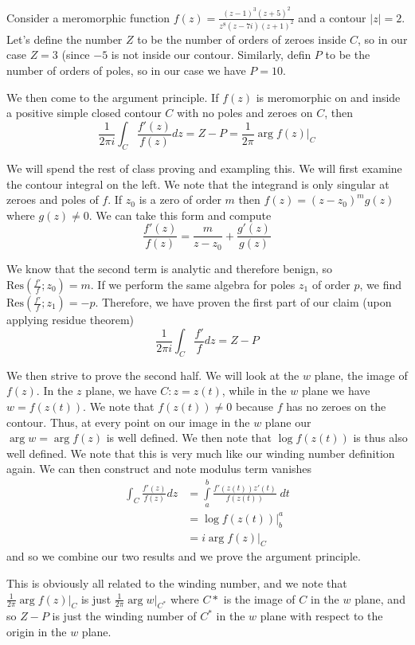 \documentclass[10pt]{report}
\newcommand{\abs}[1]{\left|#1\right|}
\newcommand{\Res}[0]{\mathrm{Res} }
\begin{document}
Consider a meromorphic function $f(z) = \frac{(z-1)^3(z+5)^2}{z^8(z-7i)(z+1)^2}$ and a contour $\abs{z} = 2$. Let's define the number $Z$ to be the number of orders of zeroes inside $C$, so in our case $Z = 3$ (since $-5$ is not inside our contour. Similarly, defin $P$ to be the number of orders of poles, so in our case we have $P=10$. 

We then come to the argument principle. If $f(z)$ is meromorphic on and inside a positive simple closed contour $C$ with no poles and zeroes on $C$, then 
$$\frac{1}{2\pi i} \int_{C}\frac{f'(z)}{f(z)}dz = Z-P = \frac{1}{2\pi}\arg f(z) \Big|_C$$

We will spend the rest of class proving and exampling this. We will first examine the contour integral on the left. We note that the integrand is only singular at zeroes and poles of $f$. If $z_0$ is a zero of order $m$ then $f(z) = (z-z_0)^mg(z)$ where $g(z) \neq 0$. We can take this form and compute
$$\frac{f'(z)}{f(z)} = \frac{m}{z-z_0} + \frac{g'(z)}{ g(z)}$$

We know that the second term is analytic and therefore benign, so $\Res\left( \frac{f'}{f};z_0 \right) = m$. If we perform the same algebra for poles $z_1$ of order $p$, we find $\Res\left( \frac{f'}{f}; z_1 \right) = -p$. Therefore, we have proven the first part of our claim (upon applying residue theorem)
$$\frac{1}{2\pi i}\int_C \frac{f'}{f}dz = Z-P$$

We then strive to prove the second half. We will look at the $w$ plane, the image of $f(z)$. In the $z$ plane, we have $C: z=z(t)$, while in the $w$ plane we have $w = f(z(t))$. We note that $f(z(t)) \neq 0$ because $f$ has no zeroes on the contour. Thus, at every point on our image in the $w$ plane our $\arg w = \arg f(z)$ is well defined. We then note that $\log f(z(t))$ is thus also well defined. We note that this is very much like our winding number definition again. We can then construct and note modulus term vanishes
\begin{align*}
    \int_{C} \frac{f'(z)}{f(z)}dz &= \displaystyle\int\limits_{a}^{b}\frac{f'(z(t))z'(t)}{f(z(t))} \;dt\\
    &= \log f(z(t))\Big|_b^a\\
    &= i\arg f(z)\Big|_C
\end{align*}
and so we combine our two results and we prove the argument principle.

This is obviously all related to the winding number, and we note that $\frac{1}{2\pi}\arg f(z)\Big|_C$ is just $\frac{1}{2\pi}\arg w\Big|_{C^*}$ where $C*$ is the image of $C$ in the $w$ plane, and so $Z-P$ is just the winding number of $C^*$ in the $w$ plane with respect to the origin in the $w$ plane.
\end{document}
